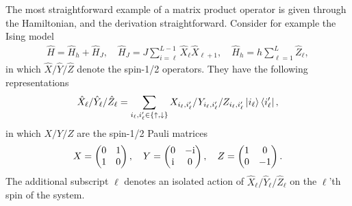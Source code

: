 The most straightforward example of a matrix product operator is given through the Hamiltonian, and the derivation straightforward.
Consider for example the Ising model
\begin{align}
    \hat H = \hat H_{h} + \hat H_{J},
    \quad
    \hat H_{J} = J\sum_{i=\ell}^{L-1}\hat X_\ell \hat X_{\ell+1},
    \quad
    \hat H_{h} = h\sum_{\ell=1}^{L}\hat Z_\ell,
\end{align}
in which $\hat X/\hat Y/\hat Z$ denote the spin-1/2 operators.
They have the following representations
\begin{align}
    \hat X_\ell/\hat Y_\ell/\hat Z_\ell = \sum_{i_\ell,i'_\ell\in\{\uparrow,\downarrow\}}X_{i_\ell,i_\ell'}/Y_{i_\ell,i_\ell'}/Z_{i_\ell,i_\ell'}\ket{i_\ell}\bra{i'_\ell},
\end{align}
in which $X/Y/Z$ are the spin-1/2 Pauli matrices
\begin{align}
    X =
    \begin{pmatrix}
        0 & 1 \\
        1 & 0
    \end{pmatrix}
    ,
    \quad
    Y =
    \begin{pmatrix}
        0 & -\mathrm i \\
        \mathrm i & 0
    \end{pmatrix}
    ,
    \quad
    Z =
    \begin{pmatrix}
        1 & 0 \\
        0 & -1
    \end{pmatrix}.
\end{align}
The additional subscript $\ell$ denotes an isolated action of $\hat X_\ell/\hat Y_\ell/\hat Z_\ell$ on the $\ell$'th spin of the system.

